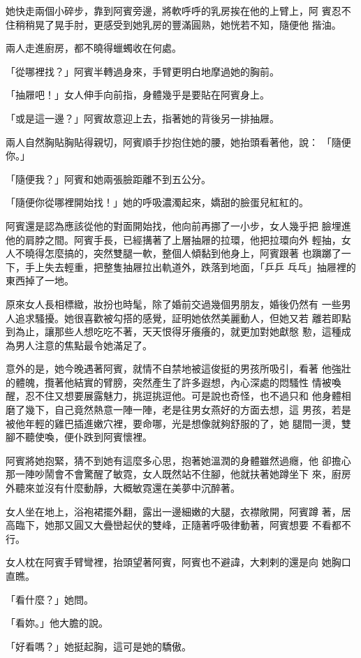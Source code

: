 她快走兩個小碎步，靠到阿賓旁邊，將軟呼呼的乳房挨在他的上臂上，阿
賓忍不住稍稍晃了晃手肘，更感受到她乳房的豐滿圓熟，她恍若不知，隨便他
揩油。

兩人走進廚房，都不曉得蠟蠋收在何處。

「從哪裡找？」阿賓半轉過身來，手臂更明白地摩過她的胸前。

「抽屜吧！」女人伸手向前指，身體幾乎是要貼在阿賓身上。

「或是這一邊？」阿賓故意迎上去，指著她的背後另一排抽屜。

兩人自然胸貼胸貼得親切，阿賓順手抄抱住她的腰，她抬頭看著他，說：
「隨便你。」

「隨便我？」阿賓和她兩張臉距離不到五公分。

「隨便你從哪裡開始找！」她的呼吸濃濁起來，嬌甜的臉蛋兒紅紅的。

阿賓還是認為應該從他的對面開始找，他向前再挪了一小步，女人幾乎把
臉埋進他的肩脖之間。阿賓手長，已經搆著了上層抽屜的拉環，他把拉環向外
輕抽，女人不曉得怎麼搞的，突然雙腿一軟，整個人傾黏到他身上，阿賓跟著
也蹎躑了一下，手上失去輕重，把整隻抽屜拉出軌道外，跌落到地面，「乒乒
乓乓」抽屜裡的東西掉了一地。

原來女人長相標緻，妝扮也時髦，除了婚前交過幾個男朋友，婚後仍然有
一些男人追求騷擾。她很喜歡被勾搭的感覺，証明她依然美麗動人，但她又若
離若即點到為止，讓那些人想吃吃不著，天天恨得牙癢癢的，就更加對她獻慇
懃，這種成為男人注意的焦點最令她滿足了。

意外的是，她今晚遇著阿賓，就情不自禁地被這俊挺的男孩所吸引，看著
他強壯的體魄，攬著他結實的臂膀，突然產生了許多遐想，內心深處的悶騷性
情被喚醒，忍不住又想要展露魅力，挑逗挑逗他。可是說也奇怪，也不過只和
他身體相磨了幾下，自己竟然熱意一陣一陣，老是往男女燕好的方面去想，這
男孩，若是被他年輕的雞巴插進嫩穴裡，要命哪，光是想像就夠舒服的了，她
腿間一燙，雙腳不聽使喚，便仆跌到阿賓懷裡。

阿賓將她抱緊，猜不到她有這麼多心思，抱著她溫潤的身體雖然過癮，他
卻擔心那一陣吵鬧會不會驚醒了敏霓，女人既然站不住腳，他就扶著她蹲坐下
來，廚房外聽來並沒有什麼動靜，大概敏霓還在美夢中沉醉著。

女人坐在地上，浴袍裙擺外翻，露出一邊細嫩的大腿，衣襟敞開，阿賓蹲
著，居高臨下，她那又圓又大疊巒起伏的雙峰，正隨著呼吸律動著，阿賓想要
不看都不行。

女人枕在阿賓手臂彎裡，抬頭望著阿賓，阿賓也不避諱，大剌剌的還是向
她胸口直瞧。

「看什麼？」她問。

「看妳。」他大膽的說。

「好看嗎？」她挺起胸，這可是她的驕傲。

